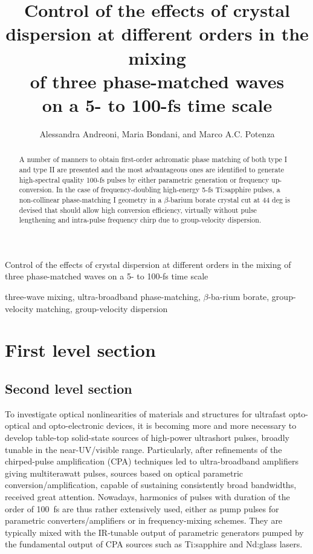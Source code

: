 \documentclass[times]{jtitauth}
\begin{document}
\title{Control of the effects of crystal\\
dispersion at different orders in the mixing\\
of three phase-matched waves\\
on a 5- to 100-fs time scale}

\author{Alessandra Andreoni,  Maria Bondani, and Marco A.C. Potenza}

{Control of the effects of crystal
dispersion at different orders in the mixing
of three phase-matched waves
on a 5- to 100-fs time scale}

\maketitle

\begin{abstract}
A number of manners to obtain first-order achromatic phase
mat\-ching  of both type I and type II are presented and the most
advantageous ones are identified to generate high-spectral quality
100-fs pulses by either parametric generation or frequency
up-conversion. In the case of frequency-doubling high-energy 5-fs
Ti:sapphire pulses, a non-collinear phase-matching I geometry in a
$\beta$-barium borate crystal cut at 44 deg is devised that should
allow high conversion efficiency, virtually without pulse
lengthening and intra-pulse frequency chirp due to group-velocity
dispersion.
\end {abstract}

\begin{keywords}
three-wave mixing, ultra-broadband phase-matching,
$\beta$-ba-rium borate, group-velocity matching, group-velocity
dispersion\
\end{keywords}

\section{First level section}

\subsection{Second level section}

To investigate optical nonlinearities of materials and structures
for ultra\-fast opto-optical and opto-electronic devices, it is
becoming more and more necessary to develop table-top solid-state
sources of high-power ultrashort pulses, broadly tunable in the
near-UV/visible range. Particularly, after refinements of the
chirped-pulse amplification (CPA) techniques led to
ultra-broadband amplifiers giving multiterawatt pulses, sources
based on optical parametric conversion/amplification, capable of
sustaining consistently broad bandwidths, received great
attention. Nowadays, harmonics of pulses with duration of the
order of 100~fs are thus rather extensively used, either as pump
pulses for parametric converters/amplifiers or in frequency-mixing
schemes. They are typically mixed with the IR-tunable output of
parametric generators pumped by the fundamental output of CPA
sources such as Ti:sapphire and Nd:glass lasers.
\end{document}
